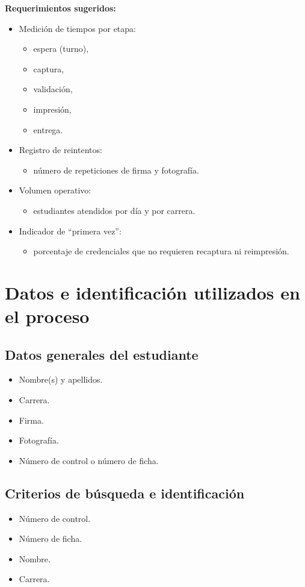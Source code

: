 \documentclass[12pt,a4paper]{article}
\begin{document}
\textbf{Requerimientos sugeridos:}
\begin{itemize}
  \item Medición de tiempos por etapa:
  \begin{itemize}
    \item espera (turno),
    \item captura,
    \item validación,
    \item impresión,
    \item entrega.
  \end{itemize}
  \item Registro de reintentos:
  \begin{itemize}
    \item número de repeticiones de firma y fotografía.
  \end{itemize}
  \item Volumen operativo:
  \begin{itemize}
    \item estudiantes atendidos por día y por carrera.
  \end{itemize}
  \item Indicador de ``primera vez'':
  \begin{itemize}
    \item porcentaje de credenciales que no requieren recaptura ni reimpresión.
  \end{itemize}
\end{itemize}

\section{Datos e identificación utilizados en el proceso}

\subsection{Datos generales del estudiante}
\begin{itemize}
  \item Nombre(s) y apellidos.
  \item Carrera.
  \item Firma.
  \item Fotografía.
  \item Número de control o número de ficha.
\end{itemize}

\subsection{Criterios de búsqueda e identificación}
\begin{itemize}
  \item Número de control.
  \item Número de ficha.
  \item Nombre.
  \item Carrera.
\end{itemize}
\end{document}
